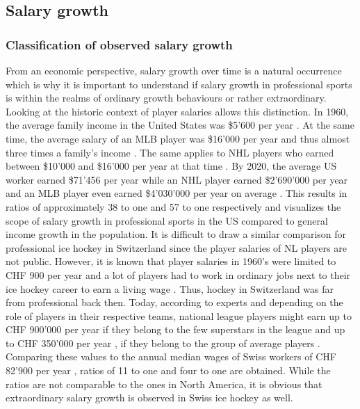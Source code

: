\documentclass[12pt, a4paper]{article}
\begin{document}
\subsection{Salary growth}

\subsubsection{Classification of observed salary growth}
\label{salaryGrowthClassification}

From an economic perspective, salary growth over time is a natural occurrence which is why it is important to understand if salary growth in professional sports is within the realms of ordinary growth behaviours or rather extraordinary. Looking at the historic context of player salaries allows this distinction. In 1960, the average family income in the United States was \$5'600 per year \citep{scammon_income_1962}. At the same time, the average salary of an MLB player was \$16'000 per year and thus almost three times a family's income \citep{haupert_economic_2007}. The same applies to NHL players who earned between \$10'000 and \$16'000 per year at that time \citep{hockey_central_original_nodate}. By 2020, the average US worker earned \$71'456 per year \citep{statista_research_departement_annual_2021} while an NHL player earned \$2'690'000 per year and an MLB player even earned \$4'030'000 per year on average \citep{gough_average_2022}. This results in ratios of approximately 38 to one and 57 to one respectively and visualizes the scope of salary growth in professional sports in the US compared to general income growth in the population. It is difficult to draw a similar comparison for professional ice hockey in Switzerland since the player salaries of NL players are not public. However, it is known that player salaries in 1960’s were limited to CHF 900 per year and a lot of players had to work in ordinary jobs next to their ice hockey career to earn a living wage \citep{koller_kanadier_2016}. Thus, hockey in Switzerland was far from professional back then. Today, according to experts and depending on the role of players in their respective teams, national league players might earn up to CHF 900'000 per year if they belong to the few superstars in the league and up to CHF 350'000 per year , if they belong to the group of average players \citep{allemann_sind_2020}. Comparing these values to the annual median wages of Swiss workers of CHF 82'900 per year \citep{bundesamt_fur_statistik_bruttoerwerbseinkommen_2021}, ratios of 11 to one and four to one are obtained. While the ratios are not comparable to the ones in North America, it is obvious that extraordinary salary growth is observed in Swiss ice hockey as well. 
\end{document}
